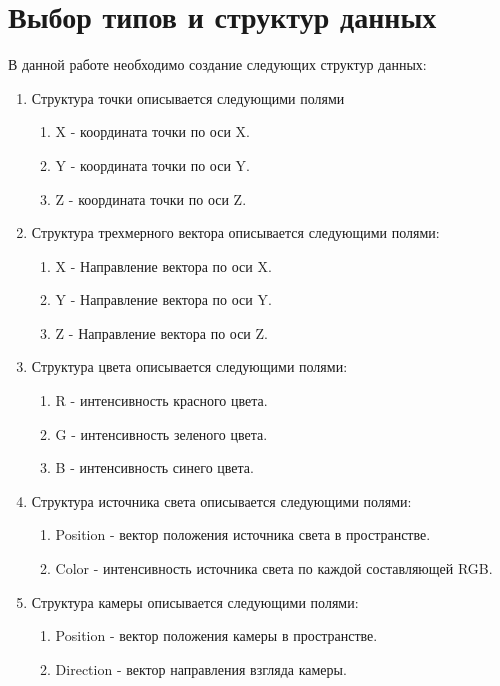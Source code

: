 \section{Выбор типов и структур данных}
В данной работе необходимо создание следующих структур данных:
\begin{enumerate}
	\item Структура точки описывается следующими полями
	\begin{enumerate}[label*=\arabic*.]
		\item X - координата точки по оси X.
		\item Y - координата точки по оси Y.
		\item Z - координата точки по оси Z.
	\end{enumerate}

	\item Структура трехмерного вектора описывается следующими полями:
	\begin{enumerate}[label*=\arabic*.]
		\item X - Направление вектора по  оси X.
		\item Y - Направление вектора  по оси Y.
		\item Z - Направление вектора  по оси Z.
	\end{enumerate}

	\item Структура цвета описывается следующими полями:
	\begin{enumerate}[label*=\arabic*.]
		\item R - интенсивность красного цвета.
		\item G - интенсивность зеленого цвета.
		\item B - интенсивность синего цвета.
	\end{enumerate}

	\item Структура источника света описывается следующими полями:
	\begin{enumerate}[label*=\arabic*.]
		\item Position - вектор положения источника света в пространстве.
		\item Color - интенсивность источника света по каждой составляющей RGB.
	\end{enumerate}

	\item Структура камеры описывается следующими полями:
	\begin{enumerate}[label*=\arabic*.]
		\item Position - вектор положения камеры в пространстве.
		\item Direction - вектор направления взгляда камеры.
	\end{enumerate}
	

\end{enumerate}
